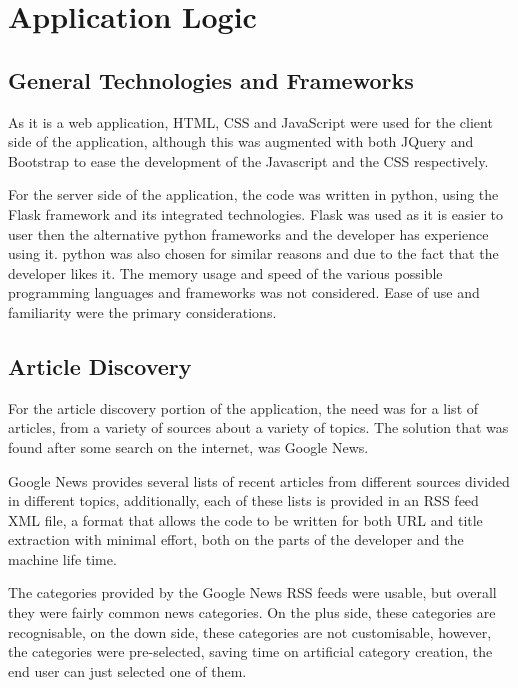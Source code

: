 \chapter{Application Logic}

\section{General Technologies and Frameworks}

As it is a web application, HTML, CSS and JavaScript were used for the client side of the application, although this was augmented with both JQuery and Bootstrap to ease the development of the Javascript and the CSS respectively. 

For the server side of the application, the code was written in python, using the Flask framework and its integrated technologies. Flask was used as it is easier to user then the alternative python frameworks and the developer has experience using it. python was also chosen for similar reasons and due to the fact that the developer likes it. The memory usage and speed of the various possible programming languages and frameworks was not considered. Ease of use and familiarity were the primary considerations. 

\section{Article Discovery}

For the article discovery portion of the application, the need was for a list of articles, from a variety of sources about a variety of topics. The solution that was found after some search on the internet, was Google News.

Google News provides several lists of recent articles from different sources divided in different topics, additionally, each of these lists is provided in an RSS feed XML file, a format that allows the code to be written for both URL and title extraction with minimal effort, both on the parts of the developer and the machine life time.

The categories provided by the Google News RSS feeds were usable, but overall they were fairly common news categories. On the plus side, these categories are recognisable, on the down side, these categories are not customisable, however, the categories were pre-selected, saving time on artificial category creation, the end user can just selected one of them. 

